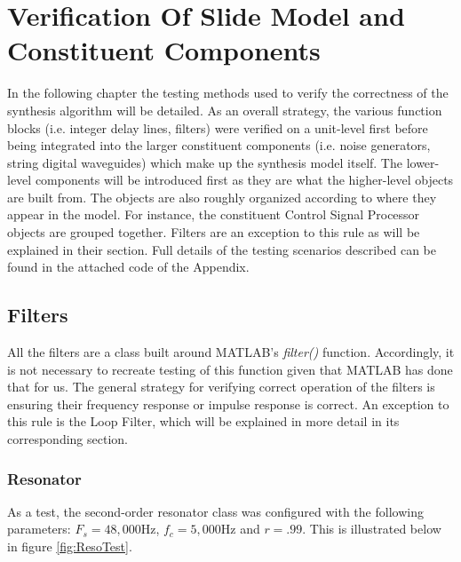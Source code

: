 \documentclass[../main.tex]{subfiles}
\begin{document}
\chapter{Verification Of Slide Model and Constituent Components}

In the following chapter the testing methods used to verify the correctness of the synthesis algorithm will be detailed. As an overall strategy, the various function blocks (i.e. integer delay lines, filters) were verified on a unit-level first before being integrated into the larger constituent components (i.e. noise generators, string digital waveguides) which make up the synthesis model itself. The lower-level components will be introduced first as they are what the higher-level objects are built from. The objects are also roughly organized according to where they appear in the model. For instance, the constituent Control Signal Processor objects are grouped together. Filters are an exception to this rule as will be explained in their section. Full details of the testing scenarios described can be found in the attached code of the Appendix.

\section{Filters}
All the filters are a class built around MATLAB's \emph{filter()} function. Accordingly, it is not necessary to recreate testing of this function given that MATLAB has done that for us. The general strategy for verifying correct operation of the filters is ensuring their frequency response or impulse response is correct. An exception to this rule is the Loop Filter, which will be explained in more detail in its corresponding section.

\subsection{Resonator}
As a test, the second-order resonator class was configured with the following parameters: $F_s = 48,000 \text{Hz}$, $f_c = 5,000 \text{Hz}$ and $r = .99$. This is illustrated below in figure \ref{fig:ResoTest}.
\end{document}
